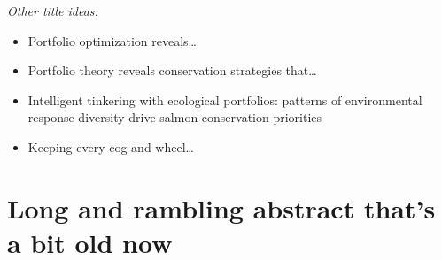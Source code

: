 \emph{Other title ideas:}

\begin{itemize}
\item
  Portfolio optimization reveals\ldots{}
\item
  Portfolio theory reveals conservation strategies that\ldots{}
\item
  Intelligent tinkering with ecological portfolios: patterns of
  environmental response diversity drive salmon conservation priorities
\item
  Keeping every cog and wheel\ldots{}
\end{itemize}

\section{Long and rambling abstract that's a bit old now}

